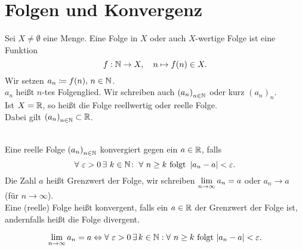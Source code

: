 \documentclass[../ana1.tex]{subfiles}
\begin{document}
\setcounter{section}{6}

\section{Folgen und Konvergenz}

\begin{defi}
	Sei \( X \neq \emptyset \) eine Menge. Eine Folge in \(X \) oder auch \(X \)-wertige Folge ist eine Funktion 
	\[ f:\mathbb{N}\rightarrow X , \quad n \mapsto f(n) \in X. \]
	Wir setzen \(a_n \coloneqq f(n) , \, n \in \mathbb{N} \).\\
	\(a_n \) heißt \(n \)-tes Folgenglied. Wir schreiben auch \({(a_n)}_{n \in \mathbb{N}}\) oder kurz \({(a_n)}_n \).\\
	Ist \(X = \mathbb{R} \), so heißt die Folge reellwertig oder reelle Folge. \\
	Dabei gilt \({(a_n)}_{n\in\mathbb{N}} \subset \mathbb{R} \).
\end{defi}

\begin{defi} \leavevmode \\
	Eine reelle Folge \({(a_n)}_{n \in \mathbb{N}} \) konvergiert gegen ein \(a \in \mathbb{R} \), falls 
	\[\forall \, \varepsilon > 0 \, \exists \, k \in \N \colon \; \forall \, n \geq k \text{ folgt } \abs{a_n - a} < \varepsilon. \]
	Die Zahl \(a\) heißt Grenzwert der Folge, wir schreiben \(\lim\limits_{n\rightarrow\infty}a_n = a\) oder \(a_n\rightarrow a\) (für \(n\rightarrow\infty \)).\\
	Eine (reelle) Folge heißt konvergent, falls ein \(a\in\mathbb{R} \) der Grenzwert der Folge ist, andernfalls heißt die Folge divergent.
\end{defi}

\begin{bem}
	\[\limes{n}a_n = a \Leftrightarrow \forall \, \varepsilon > 0 \, \exists k\in\N: \forall \, n\geq k \text{ folgt } |a_n -a|< \varepsilon.\]
\end{bem}
\end{document}
